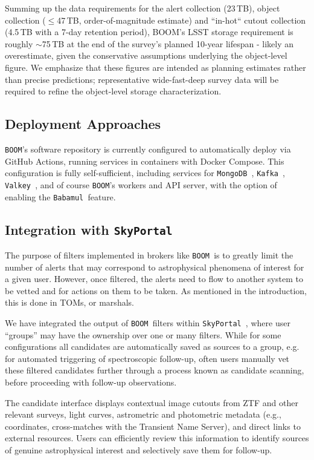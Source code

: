\documentclass[twocolumn]{aastex631}
\newcommand{\boom}{\texttt{BOOM }}
\newcommand{\babamul}{\texttt{Babamul }}
\newcommand{\kafka}{\texttt{Kafka }}
\newcommand{\valkey}{\texttt{Valkey }}
\newcommand{\mongo}{\texttt{MongoDB }}
\newcommand{\skyportal}{\texttt{SkyPortal }}
\begin{document}
Summing up the data requirements for the alert collection (23\,TB), object collection ($\le$47\,TB, order-of-magnitude estimate) and ``in-hot`` cutout collection (4.5\,TB with a 7-day retention period), BOOM's LSST storage requirement is roughly $\sim$75\,TB at the end of the survey's planned 10-year lifespan - likely an overestimate, given the conservative assumptions underlying the object-level figure. We emphasize that these figures are intended as planning estimates rather than precise predictions; representative wide-fast-deep survey data will be required to refine the object-level storage characterization.

\subsection{Deployment Approaches}

\texttt{BOOM}'s software repository is currently configured to automatically
deploy via GitHub Actions, running services in containers with Docker Compose.
This configuration is fully self-sufficient,
including services for \mongo, \kafka, \valkey, and of course \texttt{BOOM}'s
workers and API server, with the option of enabling the \babamul feature.

\subsection{Integration with \skyportal}

The purpose of filters implemented in brokers like \boom is to greatly limit the number of alerts that may correspond to astrophysical phenomena of interest for a given user. However, once filtered, the alerts need to flow to another system to be vetted and for actions on them to be taken. As mentioned in the introduction, this is done in TOMs, or marshals.

We have integrated the output of \boom filters within \skyportal, where user ``groups'' may have the ownership over one or many filters. While for some configurations all candidates are automatically saved as sources to a group, e.g. for automated triggering of spectroscopic follow-up, often users manually vet these filtered candidates further through a process known as candidate scanning, before proceeding with follow-up observations.

The candidate interface displays contextual image cutouts from ZTF and other relevant surveys, light curves, astrometric and photometric metadata (e.g., coordinates, cross-matches with the Transient Name Server), and direct links to external resources. Users can efficiently review this information to identify sources of genuine astrophysical interest and selectively save them for follow-up.
\end{document}
